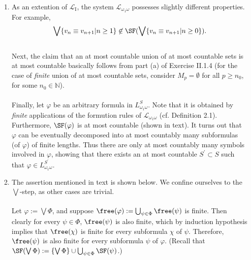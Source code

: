\begin{enumerate}[1.]
\begin{enumerate}
\begin{tabular}{ll}
\Iff & for all $\varphi \in \Phi$, $\mathfrak{I} \models \neg \neg \varphi$ \cr
\Iff & for all $\varphi \in \Phi$, $\mathfrak{I} \models \varphi$.
\end{tabular}\\
\\
First notice that the last (logical) equivalence follows from \textbf{Proposition}: \textit{For every formula $\varphi$, $\varphi \bimodels \neg \neg \varphi$} in notes to Section III.4. There is a word of caution: We cannot claim this equivalence from the derivable sequent rules
\[
\mbox{$\displaystyle \frac{\Gamma \;\;\; \varphi \phantom{\neg\neg}}{\Gamma \;\;\; \neg \neg \varphi}$ \ \ \ and
\ \ \ $\displaystyle \frac{\Gamma \;\;\; \neg \neg \varphi}{\Gamma \;\;\; \varphi \phantom{\neg\neg}}$}
\]
presented in Section IV.3 (cf. parts (a1) and (a2) of Exercise 3.6) together with the Adequacy Theorem, as these results apply to $\mathcal{L}_\mathrm{I}$ only.
\item As an extention of $\mathcal{L}_\mathrm{I}$, the system $\mathcal{L}_{\omega_1\omega}$ possesses slightly different properties. For example,
\[
\bigvee \{ v_n \equiv v_{n + 1} | n \geq 1 \} \not \in \SF(\bigvee \{ v_n \equiv v_{n + 1} | n \geq 0 \}).
\]
\\
Next, the claim that an at most countable union of at most countable sets is at most countable basically follows from part (a) of Exercise II.1.4 (for the case of \emph{finite} union of at most countable sets, consider $M_p = \emptyset$ for all $p \geq n_0$, for some $n_0 \in \mathbb{N}$).\\
\\
Finally, let $\varphi$ be an arbitrary formula in $L^S_{\omega_1\omega}$. Note that it is obtained by \emph{finite} applications of the formution rules of $\mathcal{L}_{\omega_1\omega}$ (cf. Definition 2.1). Furthermore, $\SF(\varphi)$ is at most countable (shown in text). It turns out that $\varphi$ can be eventually decomposed into at most countably many subformulas (of $\varphi$) of finite lengths. Thus there are only at most countably many symbols involved in $\varphi$, showing that there exists an at most countable $S^\prime \subset S$ such that $\varphi \in L^{S^\prime}_{\omega_1\omega}$.
\item The assertion mentioned in text is shown below. We confine ourselves to the $\bigvee$-step, as other cases are trivial.\\
\\
Let $\varphi := \bigvee \Phi$, and suppose $\free(\varphi) := \bigcup_{\psi \in \Phi} \free(\psi)$ is finite. Then clearly for every $\psi \in \Phi$, $\free(\psi)$ is also finite, which by induction hypothesis implies that $\free(\chi)$ is finite for every subformula $\chi$ of $\psi$. Therefore, $\free(\psi)$ is also finite for every subformula $\psi$ of $\varphi$. (Recall that $\SF(\bigvee \Phi) := \{ \bigvee \Phi \} \cup \bigcup_{\psi \in \Phi} \SF(\psi)$.)\\

\end{enumerate}
\end{enumerate}
